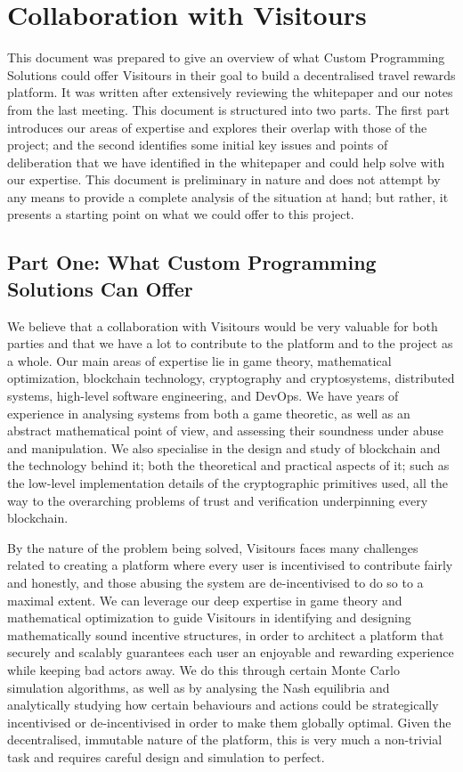 \documentclass[fontsize=12pt,a4paper]{article}
\begin{document}
\section*{Collaboration with Visitours}

This document was prepared to give an overview of what Custom Programming Solutions could offer Visitours in their goal to build a decentralised travel rewards platform. It was written after extensively reviewing the whitepaper and our notes from the last meeting. This document is structured into two parts. The first part introduces our areas of expertise and explores their overlap with those of the project; and the second identifies some initial key issues and points of deliberation that we have identified in the whitepaper and could help solve with our expertise. This document is preliminary in nature and does not attempt by any means to provide a complete analysis of the situation at hand; but rather, it presents a starting point on what we could offer to this project.

\subsection*{Part One: What Custom Programming Solutions Can Offer}

We believe that a collaboration with Visitours would be very valuable for both parties and that we have a lot to contribute to the platform and to the project as a whole. Our main areas of expertise lie in game theory, mathematical optimization, blockchain technology, cryptography and cryptosystems, distributed systems, high-level software engineering, and DevOps. We have years of experience in analysing systems from both a game theoretic, as well as an abstract mathematical point of view, and assessing their soundness under abuse and manipulation. We also specialise in the design and study of blockchain and the technology behind it; both the theoretical and practical aspects of it; such as the low-level implementation details of the cryptographic primitives used, all the way to the overarching problems of trust and verification underpinning every blockchain.

By the nature of the problem being solved, Visitours faces many challenges related to creating a platform where every user is incentivised to contribute fairly and honestly, and those abusing the system are de-incentivised to do so to a maximal extent. We can leverage our deep expertise in game theory and mathematical optimization to guide Visitours in identifying and designing mathematically sound incentive structures, in order to architect a platform that securely and scalably guarantees each user an enjoyable and rewarding experience while keeping bad actors away. We do this through certain Monte Carlo simulation algorithms, as well as by analysing the Nash equilibria and analytically studying how certain behaviours and actions could be strategically incentivised or de-incentivised in order to make them globally optimal. Given the decentralised, immutable nature of the platform, this is very much a non-trivial task and requires careful design and simulation to perfect.
\end{document}

